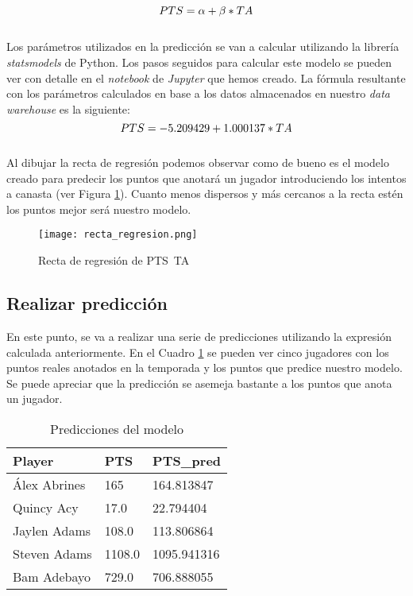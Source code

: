 \documentclass[11pt]{diazessay} %
\begin{document}
\begin{equation}
\centering
PTS = \alpha + \beta * TA
\end{equation}
\\
Los parámetros utilizados en la predicción se van a calcular utilizando la librería \textit{statsmodels} \cite{statsmodels} de Python. Los pasos seguidos para calcular este modelo se pueden ver con detalle en el \textit{notebook} de \textit{Jupyter} \cite{jupyter} que hemos creado. La fórmula resultante con los parámetros calculados en base a los datos almacenados en nuestro \textit{data warehouse} es la siguiente:\\
\begin{equation}
\centering
PTS = -5.209429 + 1.000137 * TA
\end{equation}
\\
Al dibujar la recta de regresión \cite{recta} podemos observar como de bueno es el modelo creado para predecir los puntos que anotará un jugador introduciendo los intentos a canasta (ver Figura \ref{fig:recta}). Cuanto menos dispersos y más cercanos a la recta estén los puntos mejor será nuestro modelo.

\begin{figure}[!h]
	\centering
	\texttt{[image: recta\_regresion.png]}
	\caption{Recta de regresión de PTS~TA}
	\label{fig:recta}
\end{figure}

\subsection*{Realizar predicción}
En este punto, se va a realizar una serie de predicciones utilizando la expresión calculada anteriormente. En el Cuadro \ref{pred} se pueden ver cinco jugadores con los puntos reales anotados en la temporada y los puntos que predice nuestro modelo. Se puede apreciar que la predicción se asemeja bastante a los puntos que anota un jugador. \\

\begin{table}[!h]
	\centering
	\begin{tabular}{|l|l|l|}
		\hline
		\textbf{Player} & \textbf{PTS} & \textbf{PTS\_pred} \\ \hline
		Álex Abrines    & 165          & 164.813847         \\ \hline
		Quincy Acy      & 17.0         & 22.794404          \\ \hline
		Jaylen Adams    & 108.0        & 113.806864         \\ \hline
		Steven Adams    & 1108.0       & 1095.941316        \\ \hline
		Bam Adebayo     & 729.0        & 706.888055         \\ \hline
	\end{tabular}
	\caption{Predicciones del modelo}
	\label{pred}
\end{table}
\end{document}
